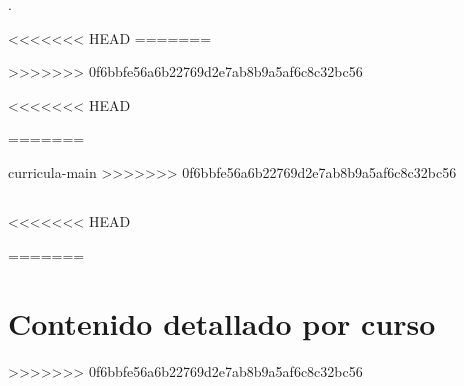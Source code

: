 


 
				\newpage
				\newpage
 
\setcounter{page}{1}
\pagestyle{plain}
					\newpage 
	\newpage
 
\tableofcontents
\listoffigures
\listoftables
  
			\newpage
		\newpage
. \newpage
 
\begin{btUnit}
\pagestyle{plain}
\setcounter{page}{1}

<<<<<<< HEAD
%
=======

>>>>>>> 0f6bbfe56a6b22769d2e7ab8b9a5af6c8c32bc56



<<<<<<< HEAD
%

=======


\begin{btSect}[apalike]{curricula-main}
>>>>>>> 0f6bbfe56a6b22769d2e7ab8b9a5af6c8c32bc56
\section*{\BibliographySection}
\btPrintCited
\end{btSect}
\end{btUnit}
  
<<<<<<< HEAD
%

 
%
=======
\chapter{Contenido detallado por curso}\label{chap:syllabi}


\NotUTEC{}
 

>>>>>>> 0f6bbfe56a6b22769d2e7ab8b9a5af6c8c32bc56


